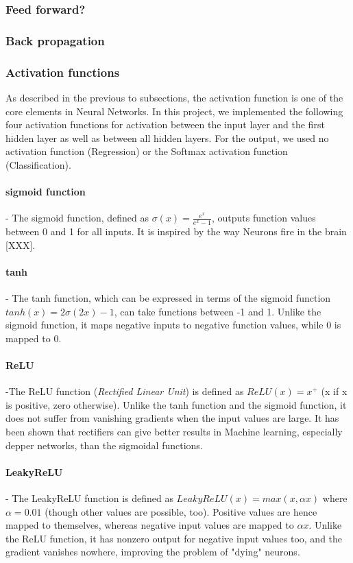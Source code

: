 \documentclass[11pt,a4paper,titlepage]{article}
\begin{document}
\subsubsection{Feed forward?}
\subsubsection{Back propagation}
\subsubsection{Activation functions}
As described in the previous to subsections, the activation function is one of the core elements in Neural Networks. In this project, we implemented the following four activation functions for activation between the input layer and the first hidden layer as well as between all hidden layers. For the output, we used no activation function (Regression) or the Softmax activation function (Classification). 

\paragraph*{sigmoid function} - The sigmoid function, defined as $\sigma(x)=\frac{e^x}{e^x-1}$, outputs function values between 0 and 1 for all inputs. It is inspired by the way Neurons fire in the brain [XXX].
\paragraph*{tanh} - The tanh function, which can be expressed in terms of the sigmoid function $tanh(x)=2\sigma(2x)-1$, can take functions between -1 and 1. Unlike the sigmoid function, it maps negative inputs to negative function values, while 0 is mapped to 0.
\paragraph*{ReLU} -The ReLU function (\textit{Rectified Linear Unit}) is defined as $ReLU(x)=x^+$ (x if x is positive, zero otherwise). Unlike the tanh function and the sigmoid function, it does not suffer from vanishing gradients when the input values are large. It has been shown \citep{surpremeRELU} that rectifiers can give better results in Machine learning, especially depper networks, than the sigmoidal functions.
\paragraph*{LeakyReLU} - The LeakyReLU function is defined as $LeakyReLU(x)=max(x,\alpha x)$ where $\alpha=0.01$ (though other values are possible, too). Positive values are hence mapped to themselves, whereas negative input values are mapped to $\alpha x$. Unlike the ReLU function, it has nonzero output for negative input values too, and the gradient vanishes nowhere, improving the problem of "dying" neurons.
\end{document}
